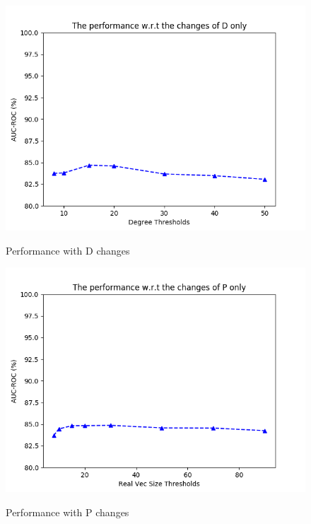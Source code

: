 \documentclass[review]{elsarticle}
\begin{document}
\begin{figure}[!tbp]
\centering
  \begin{minipage}[b]{0.47\textwidth}
    \includegraphics[width=\textwidth]{degree.png}
    \label{fig:D-change}
    \caption{Performance with D changes}
  \end{minipage}
  \begin{minipage}[b]{0.47\textwidth}
    \includegraphics[width=\textwidth]{vec_size.png}
    \label{fig:vs-change}
    \caption{Performance with P changes}
  \end{minipage}  
\end{figure}
\end{document}
